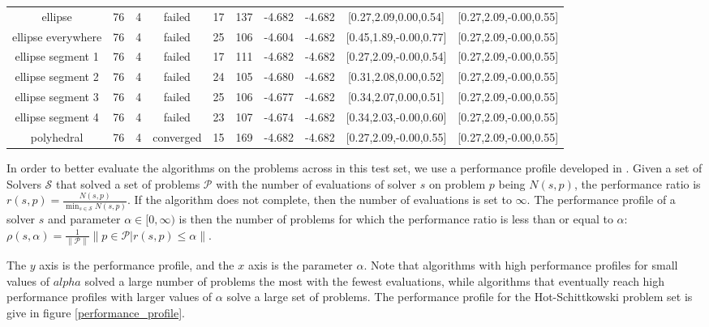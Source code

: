 \begin{tiny}
\begin{center}
\begin{tabular}{ c c c c c c c c c c }
         ellipse          &   76  &  4  &   failed   &   17  &  137  &   -4.682   &   -4.682   & [0.27,2.09,0.00,0.54] & [0.27,2.09,-0.00,0.55] \\
    ellipse everywhere    &   76  &  4  &   failed   &   25  &  106  &   -4.604   &   -4.682   & [0.45,1.89,-0.00,0.77] & [0.27,2.09,-0.00,0.55] \\
    ellipse segment 1     &   76  &  4  &   failed   &   17  &  111  &   -4.682   &   -4.682   & [0.27,2.09,-0.00,0.54] & [0.27,2.09,-0.00,0.55] \\
    ellipse segment 2     &   76  &  4  &   failed   &   24  &  105  &   -4.680   &   -4.682   & [0.31,2.08,0.00,0.52] & [0.27,2.09,-0.00,0.55] \\
    ellipse segment 3     &   76  &  4  &   failed   &   25  &  106  &   -4.677   &   -4.682   & [0.34,2.07,0.00,0.51] & [0.27,2.09,-0.00,0.55] \\
    ellipse segment 4     &   76  &  4  &   failed   &   23  &  107  &   -4.674   &   -4.682   & [0.34,2.03,-0.00,0.60] & [0.27,2.09,-0.00,0.55] \\
        polyhedral        &   76  &  4  & converged  &   15  &  169  &   -4.682   &   -4.682   & [0.27,2.09,-0.00,0.55] & [0.27,2.09,-0.00,0.55]
\end{tabular}
\end{center}


\end{tiny}

In order to better evaluate the algorithms on the problems across in this test set, we use a performance profile developed in \cite{More:2009:BDO:1654367.1654371}.
Given a set of Solvers $\mathcal S$ that solved a set of problems $\mathcal P$ with the number of evaluations of solver $s$ on problem $p$ being $N(s, p)$, the performance ratio is $r(s, p) = \frac{N(s, p)}{\min_{s \in \mathcal S} N(s, p)}$.
If the algorithm does not complete, then the number of evaluations is set to $\infty$.
The performance profile of a solver $s$ and parameter $\alpha \in [0, \infty)$ is then the number of problems for which the performance ratio is less than or equal to
 $\alpha$: 
 $\rho(s, \alpha) = \frac 1 {\|\mathcal P \|} \|p \in \mathcal P | r(s, p) \le \alpha\|$.

The $y$ axis is the performance profile, and the $x$ axis is the parameter $\alpha$.
Note that algorithms with high performance profiles for small values of $alpha$ solved a large number of problems the most with the fewest evaluations, while algorithms that eventually reach high performance profiles with larger values of $\alpha$ solve a large set of problems.
The performance profile for the Hot-Schittkowski problem set is give in figure \cref{performance_profile}.


